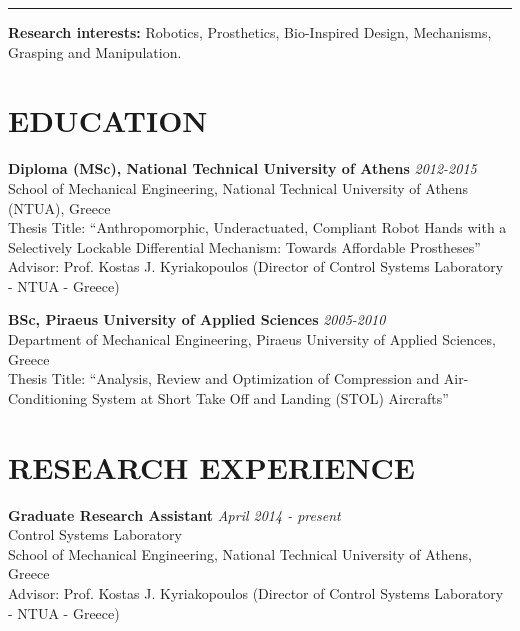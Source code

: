 \documentclass[11pt]{res} %
\begin{document}
\begin{resume}
\noindent\rule{16.6cm}{0.4pt}

\textbf{Research interests:} Robotics, Prosthetics, Bio-Inspired Design, Mechanisms, Grasping and Manipulation. 


\section{EDUCATION} 
\vspace{4pt} %
\small\textbf{Diploma (MSc), National Technical University of Athens} \hfill {\sl 2012-2015}
\\School of Mechanical Engineering, National Technical University of Athens (NTUA), Greece
\\Thesis Title: ``Anthropomorphic, Underactuated, Compliant Robot Hands with a Selectively Lockable Differential Mechanism: Towards Affordable Prostheses''
\\Advisor: Prof. Kostas J. Kyriakopoulos (Director of Control Systems Laboratory - NTUA - Greece)
 
\small\textbf{BSc, Piraeus University of Applied Sciences} \hfill {\sl 2005-2010}  
\\Department of Mechanical Engineering, Piraeus University of Applied Sciences, Greece 
\\Thesis Title: ``Analysis, Review and Optimization of Compression and Air-Conditioning System at Short Take Off and Landing (STOL) Aircrafts''
\vspace{0.1in} %
\section{RESEARCH EXPERIENCE}
\vspace{4pt} %
\small\textbf{Graduate Research Assistant} \hfill {\sl April 2014 - present}
\\Control Systems Laboratory
\\School of Mechanical Engineering, National Technical University of Athens, Greece
\\Advisor: Prof. Kostas J. Kyriakopoulos (Director of Control Systems Laboratory - NTUA - Greece)
 

\end{resume}
\end{document}

